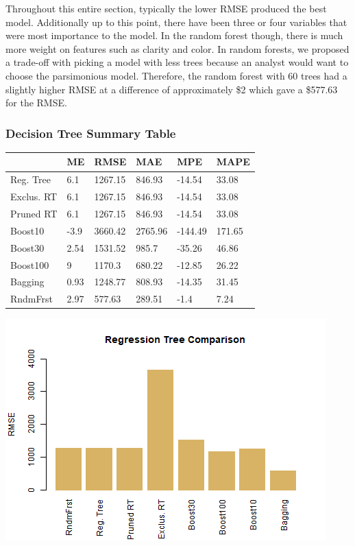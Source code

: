 \documentclass[
  paper=a4,
  ,captions=tableheading
]{scrartcl}
\begin{document}
Throughout this entire section, typically the lower RMSE produced the
best model. Additionally up to this point, there have been three or four
variables that were most importance to the model. In the random forest
though, there is much more weight on features such as clarity and color.
In random forests, we proposed a trade-off with picking a model with
less trees because an analyst would want to choose the parsimonious
model. Therefore, the random forest with 60 trees had a slightly higher
RMSE at a difference of approximately \$2 which gave a \$577.63 for the
RMSE.

\hypertarget{decision-tree-summary-table}{%
\subsubsection{Decision Tree Summary
Table}\label{decision-tree-summary-table}}

\begin{table}
\centering
\begin{tabu} to 
\hline
  & ME & RMSE & MAE & MPE & MAPE\\
\hline
Reg. Tree & 6.1 & 1267.15 & 846.93 & -14.54 & 33.08\\
\hline
Exclus. RT & 6.1 & 1267.15 & 846.93 & -14.54 & 33.08\\
\hline
Pruned RT & 6.1 & 1267.15 & 846.93 & -14.54 & 33.08\\
\hline
Boost10 & -3.9 & 3660.42 & 2765.96 & -144.49 & 171.65\\
\hline
Boost30 & 2.54 & 1531.52 & 985.7 & -35.26 & 46.86\\
\hline
Boost100 & 9 & 1170.3 & 680.22 & -12.85 & 26.22\\
\hline
Bagging & 0.93 & 1248.77 & 808.93 & -14.35 & 31.45\\
\hline
RndmFrst & 2.97 & 577.63 & 289.51 & -1.4 & 7.24\\
\hline
\end{tabu}
\end{table}

\begin{center}\includegraphics{Diamonds_PDF_files/figure-latex/RegTree Summary-1} \end{center}
\end{document}
